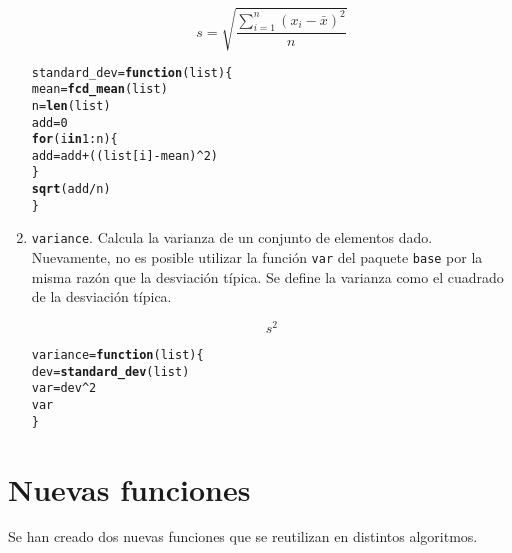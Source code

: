 \documentclass[12pt]{report}\usepackage[]{graphicx}\usepackage[dvipsnames]{xcolor}
\makeatletter
\newcommand{\hlnum}[1]{\textcolor[rgb]{0.686,0.059,0.569}{#1}}%
\newcommand{\hlopt}[1]{\textcolor[rgb]{0,0,0}{#1}}%
\newcommand{\hlstd}[1]{\textcolor[rgb]{0.345,0.345,0.345}{#1}}%
\newcommand{\hlkwa}[1]{\textcolor[rgb]{0.161,0.373,0.58}{\textbf{#1}}}%
\newcommand{\hlkwb}[1]{\textcolor[rgb]{0.69,0.353,0.396}{#1}}%
\newcommand{\hlkwc}[1]{\textcolor[rgb]{0.333,0.667,0.333}{#1}}%
\newcommand{\hlkwd}[1]{\textcolor[rgb]{0.737,0.353,0.396}{\textbf{#1}}}%
\newenvironment{kframe}{%
 \def\at@end@of@kframe{}%
 \ifinner\ifhmode%
  \def\at@end@of@kframe{\end{minipage}}%
  \begin{minipage}{\columnwidth}%
 \fi\fi%
 \def\FrameCommand##1{\hskip\@totalleftmargin \hskip-\fboxsep
 \colorbox{shadecolor}{##1}\hskip-\fboxsep
     \hskip-\linewidth \hskip-\@totalleftmargin \hskip\columnwidth}%
 \MakeFramed {\advance\hsize-\width
   \@totalleftmargin\z@ \linewidth\hsize
   \@setminipage}}%
 {\par\unskip\endMakeFramed%
 \at@end@of@kframe}
\newenvironment{knitrout}{}{} %
\makeatother
\begin{document}
\begin{enumerate}[label = \textbf{\arabic*.}]
		 		$$
		 		s = \sqrt{\frac{\displaystyle\sum_{i=1}^n (x_i-\bar{x})^2}{n}}
		 		$$
		 		
\begin{knitrout}
\color{fgcolor}\begin{kframe}
\begin{alltt}
\hlstd{standard_dev} \hlkwb{=} \hlkwa{function}\hlstd{(}\hlkwc{list}\hlstd{) \{}
        \hlstd{mean} \hlkwb{=} \hlkwd{fcd_mean}\hlstd{(list)}
        \hlstd{n} \hlkwb{=} \hlkwd{len}\hlstd{(list)}
        \hlstd{add} \hlkwb{=} \hlnum{0}
        \hlkwa{for} \hlstd{(i} \hlkwa{in} \hlnum{1}\hlopt{:}\hlstd{n) \{}
                \hlstd{add} \hlkwb{=} \hlstd{add} \hlopt{+} \hlstd{((list[i]} \hlopt{-} \hlstd{mean)}\hlopt{^}\hlnum{2}\hlstd{)}
        \hlstd{\}}
        \hlkwd{sqrt}\hlstd{(add}\hlopt{/}\hlstd{n)}
\hlstd{\}}
\end{alltt}
\end{kframe}
\end{knitrout}
		 		
		 		\item \texttt{variance}. Calcula la varianza de un conjunto de elementos dado. Nuevamente, no es posible utilizar la función \texttt{var} del paquete \texttt{base} por la misma razón que la desviación típica. Se define la varianza como el cuadrado de la desviación típica.
		 		
		 		$$
		 		s^2
		 		$$
		 		
\begin{knitrout}
\color{fgcolor}\begin{kframe}
\begin{alltt}
\hlstd{variance} \hlkwb{=} \hlkwa{function}\hlstd{(}\hlkwc{list}\hlstd{) \{}
        \hlstd{dev} \hlkwb{=} \hlkwd{standard_dev}\hlstd{(list)}
        \hlstd{var} \hlkwb{=} \hlstd{dev}\hlopt{^}\hlnum{2}
        \hlstd{var}
\hlstd{\}}
\end{alltt}
\end{kframe}
\end{knitrout}
		 		
		 	\end{enumerate}
	 	
	 	\section{Nuevas funciones}
	 	
		 	Se han creado dos nuevas funciones que se reutilizan en distintos algoritmos.
		 	
\end{document}
